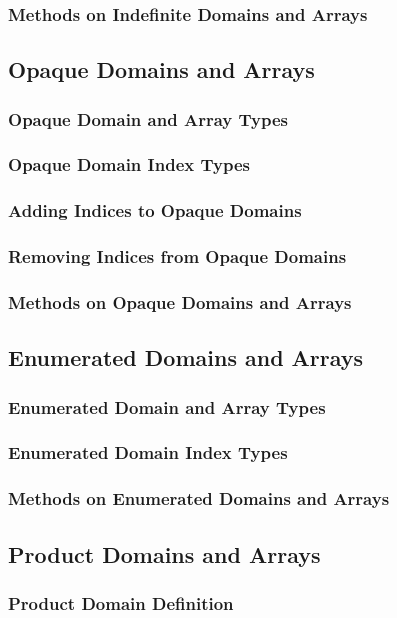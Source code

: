 \documentclass[10pt,twoside,titlepage]{article}
\begin{document}
\subsubsection{Methods on Indefinite Domains and Arrays}
\subsection{Opaque Domains and Arrays}
\subsubsection{Opaque Domain and Array Types}
\subsubsection{Opaque Domain Index Types}
\subsubsection{Adding Indices to Opaque Domains}
\subsubsection{Removing Indices from Opaque Domains}
\subsubsection{Methods on Opaque Domains and Arrays}
\subsection{Enumerated Domains and Arrays}
\subsubsection{Enumerated Domain and Array Types}
\subsubsection{Enumerated Domain Index Types}
\subsubsection{Methods on Enumerated Domains and Arrays}
\subsection{Product Domains and Arrays}
\subsubsection{Product Domain Definition}
\end{document}
